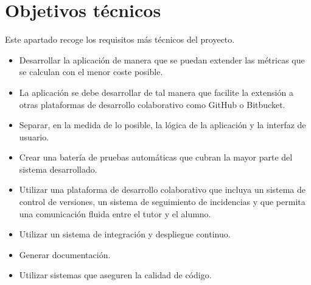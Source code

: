 \section{Objetivos técnicos}
Este apartado recoge los requisitos más técnicos del proyecto.
\begin{itemize}
	\tightlist
	\item Desarrollar la aplicación de manera que se puedan extender las métricas que se calculan con el menor coste posible.
	\item La aplicación se debe desarrollar de tal manera que facilite la extensión a otras plataformas de desarrollo colaborativo como GitHub o Bitbucket.
	\item Separar, en la medida de lo posible, la lógica de la aplicación y la interfaz de usuario.
	\item Crear una batería de pruebas automáticas que cubran la mayor parte del sistema desarrollado.
	\item Utilizar una plataforma de desarrollo colaborativo que incluya un sistema de control de versiones, un sistema de seguimiento de incidencias y que permita una comunicación fluida entre el tutor y el alumno.
	\item Utilizar un sistema de integración y despliegue continuo.
	\item Generar documentación.
	\item Utilizar sistemas que aseguren la calidad de código.
\end{itemize}
